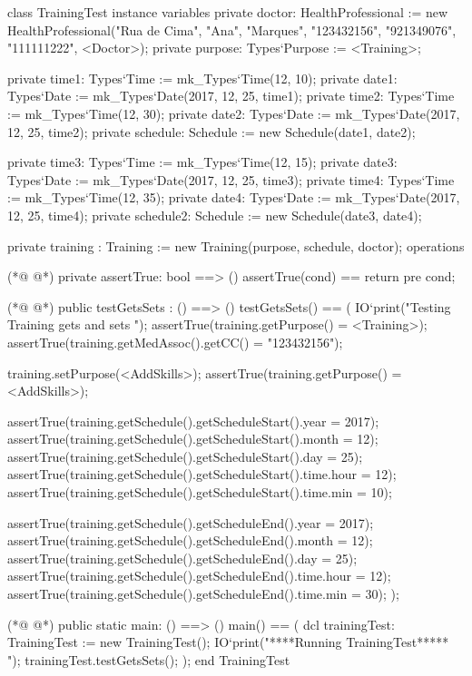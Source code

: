 \begin{vdmpp}[breaklines=true]
class TrainingTest
instance variables
 private doctor: HealthProfessional := new HealthProfessional("Rua de Cima", "Ana", "Marques", "123432156", "921349076", "111111222", <Doctor>);
  private purpose: Types`Purpose := <Training>;
  
 private time1: Types`Time := mk_Types`Time(12, 10);
 private date1: Types`Date := mk_Types`Date(2017, 12, 25, time1);
 private time2: Types`Time := mk_Types`Time(12, 30);
 private date2: Types`Date := mk_Types`Date(2017, 12, 25, time2);
 private schedule: Schedule := new Schedule(date1, date2);
 
 private time3: Types`Time := mk_Types`Time(12, 15);
 private date3: Types`Date := mk_Types`Date(2017, 12, 25, time3);
 private time4: Types`Time := mk_Types`Time(12, 35);
 private date4: Types`Date := mk_Types`Date(2017, 12, 25, time4);
 private schedule2: Schedule := new Schedule(date3, date4);
 
 private training : Training := new Training(purpose, schedule, doctor);
operations
 
(*@
\label{assertTrue:21}
@*)
 private assertTrue: bool ==> ()
  assertTrue(cond) == return
 pre cond;
 
(*@
\label{testGetsSets:25}
@*)
 public testGetsSets : () ==> ()
  testGetsSets() == (
   IO`print("\n Testing Training gets and sets \n");
   assertTrue(training.getPurpose() = <Training>);
   assertTrue(training.getMedAssoc().getCC() = "123432156");
   
   training.setPurpose(<AddSkills>);
   assertTrue(training.getPurpose() = <AddSkills>);
   
   assertTrue(training.getSchedule().getScheduleStart().year = 2017);
   assertTrue(training.getSchedule().getScheduleStart().month = 12);
   assertTrue(training.getSchedule().getScheduleStart().day = 25);
   assertTrue(training.getSchedule().getScheduleStart().time.hour = 12);
   assertTrue(training.getSchedule().getScheduleStart().time.min = 10);
   
   assertTrue(training.getSchedule().getScheduleEnd().year = 2017);
   assertTrue(training.getSchedule().getScheduleEnd().month = 12);
   assertTrue(training.getSchedule().getScheduleEnd().day = 25);
   assertTrue(training.getSchedule().getScheduleEnd().time.hour = 12);
   assertTrue(training.getSchedule().getScheduleEnd().time.min = 30);
  );

(*@
\label{main:47}
@*)
 public static main: () ==> ()
   main() == (
    dcl trainingTest: TrainingTest := new TrainingTest();
    IO`print("\n *****Running TrainingTest***** \n");
    trainingTest.testGetsSets();
   );
end TrainingTest
\end{vdmpp}
